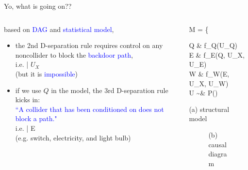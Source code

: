 %
%
\begin{frame}
	{Yo, what is going on??}
	\begin{columns}
		\begin{column}{0.5\textwidth}
			based on \textcolor{blue}{DAG} and \textcolor{blue}{statistical model},
			\begin{itemize}
				\item the 2nd D-separation rule requires control on any noncollider to block the \textcolor{blue}{backdoor path}, \\
				i.e.  \; | $U_{X}$ \\
				{\small (but it is \textcolor{blue}{impossible})}
				\item if we use $Q$ in the model, the 3rd D-separation rule kicks in: \\
				\textcolor{blue}{``A collider that has been conditioned on does not block a path."}\\
				i.e.  \; | E \\
				{(e.g. switch, electricity, and light bulb)}
			\end{itemize}
		\end{column}
		\begin{column}{0.5\textwidth}  
			\begin{equ}
				M = \left\{ \begin{aligned} 
					Q \leftarrow & \; f_{Q}(U_{Q}) \\
					E \leftarrow & \; f_{E}(Q, U_{X}, U_{E}) \\
					W \leftarrow & \; f_{W}(E, U_{X}, U_{W}) \\
					U \sim & \; P()
				\end{aligned} \right
				\caption*{(a) structural model}
			\end{equ}
			\begin{figure}
				\caption*{(b) causal diagram}
			\end{figure}
		\end{column}
	\end{columns}
\end{frame}

